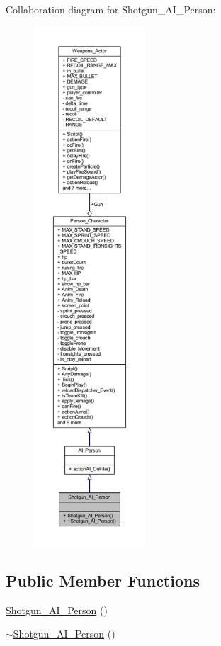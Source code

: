 Collaboration diagram for Shotgun\+\_\+\+A\+I\+\_\+\+Person\+:\nopagebreak
\begin{figure}[H]
\begin{center}
\leavevmode
\includegraphics[height=550pt]{class_shotgun___a_i___person__coll__graph}
\end{center}
\end{figure}
\subsection*{Public Member Functions}
\begin{DoxyCompactItemize}
\item 
\hyperlink{class_shotgun___a_i___person_a3fe6dcf1c21ecb196ed090741be52244}{Shotgun\+\_\+\+A\+I\+\_\+\+Person} ()
\item 
\hyperlink{class_shotgun___a_i___person_a6b53c7974e317d2290a0c5ae12cb3d55}{$\sim$\+Shotgun\+\_\+\+A\+I\+\_\+\+Person} ()
\end{DoxyCompactItemize}
